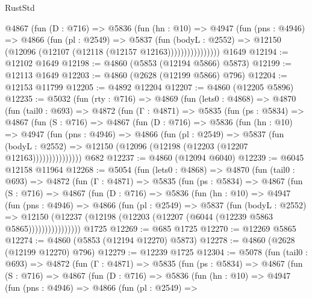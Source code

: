 \begin{lexlean}{RustStd}
\begin{coremodule}
                @4867
                  (fun (D : @716) =>
                  @5836
                    (fun (hn : @10) =>
                    @4947
                      (fun (pns : @4946) =>
                      @4866
                        (fun (pl : @2549) =>
                        @5837
                          (fun (bodyL : @2552) =>
                          @12150 (@12096 (@12107 (@12118 (@12157 @12163))))))))))))))))
    @1649
@12194 := @12102 @1649
@12198 := @4860 (@5853 (@12194 @5866) @5873)
@12199 := @12113 @1649
@12203 := @4860 (@2628 (@12199 @5866) @796)
@12204 := @12153 @11799
@12205 := @4892 @12204
@12207 := @4860 (@12205 @5896)
@12235 := @5032
    (fun (rty : @716) =>
    @4869
      (fun (lets0 : @4868) =>
      @4870
        (fun (tail0 : @693) =>
        @4872
          (fun (Γ : @4871) =>
          @5835
            (fun (ps : @5834) =>
            @4867
              (fun (S : @716) =>
              @4867
                (fun (D : @716) =>
                @5836
                  (fun (hn : @10) =>
                  @4947
                    (fun (pns : @4946) =>
                    @4866
                      (fun (pl : @2549) =>
                      @5837
                        (fun (bodyL : @2552) =>
                        @12150 (@12096 (@12198 (@12203 (@12207 @12163)))))))))))))))
    @682
@12237 := @4860 (@12094 @6040)
@12239 := @6045 @12158 @11964
@12268 := @5054
    (fun (lets0 : @4868) =>
    @4870
      (fun (tail0 : @693) =>
      @4872
        (fun (Γ : @4871) =>
        @5835
          (fun (ps : @5834) =>
          @4867
            (fun (S : @716) =>
            @4867
              (fun (D : @716) =>
              @5836
                (fun (hn : @10) =>
                @4947
                  (fun (pns : @4946) =>
                  @4866
                    (fun (pl : @2549) =>
                    @5837
                      (fun (bodyL : @2552) =>
                      @12150
                        (@12237 (@12198 (@12203 (@12207 (@6044 (@12239 @5863 @5865))))))))))))))))
    @1725
@12269 := @685 @1725
@12270 := @12269 @5865
@12274 := @4860 (@5853 (@12194 @12270) @5873)
@12278 := @4860 (@2628 (@12199 @12270) @796)
@12279 := @12239 @1725
@12304 := @5078
    (fun (tail0 : @693) =>
    @4872
      (fun (Γ : @4871) =>
      @5835
        (fun (ps : @5834) =>
        @4867
          (fun (S : @716) =>
          @4867
            (fun (D : @716) =>
            @5836
              (fun (hn : @10) =>
              @4947
                (fun (pns : @4946) =>
                @4866
                  (fun (pl : @2549) =>

\end{coremodule}
\end{lexlean}

